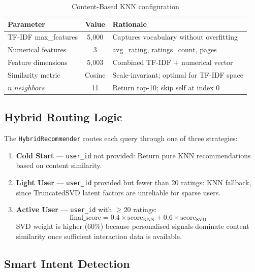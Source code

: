 \documentclass[12pt, a4paper]{article}
\begin{document}
\begin{table}[H]
  \centering
  \caption{Content-Based KNN configuration}
  \label{tab:knn_config}
  \begin{tabular}{|l|c|p{6cm}|}
    \hline
    \textbf{Parameter} & \textbf{Value} & \textbf{Rationale} \\
    \hline
    TF-IDF max\_features & 5,000 & Captures vocabulary without overfitting \\
    \hline
    Numerical features & 3 & avg\_rating, ratings\_count, pages \\
    \hline
    Feature dimensions & 5,003 & Combined TF-IDF + numerical vector \\
    \hline
    Similarity metric & Cosine & Scale-invariant; optimal for TF-IDF space \\
    \hline
    $n\_neighbors$ & 11 & Return top-10; skip self at index 0 \\
    \hline
  \end{tabular}
\end{table}

\subsection{Hybrid Routing Logic}
\label{sec:routing}

The \texttt{HybridRecommender} routes each query through one of three strategies:

\begin{enumerate}
  \item \textbf{Cold Start} --- \texttt{user\_id} not provided:
        Return pure KNN recommendations based on content similarity.
  \item \textbf{Light User} --- \texttt{user\_id} provided but fewer than 20 ratings:
        KNN fallback, since TruncatedSVD latent factors are unreliable for sparse users.
  \item \textbf{Active User} --- \texttt{user\_id} with $\geq 20$ ratings:
        \[
          \text{final\_score} = 0.4 \times \text{score}_{\text{KNN}} + 0.6 \times \text{score}_{\text{SVD}}
        \]
        SVD weight is higher (60\%) because personalised signals dominate content similarity
        once sufficient interaction data is available.
\end{enumerate}

\subsection{Smart Intent Detection}
\end{document}
